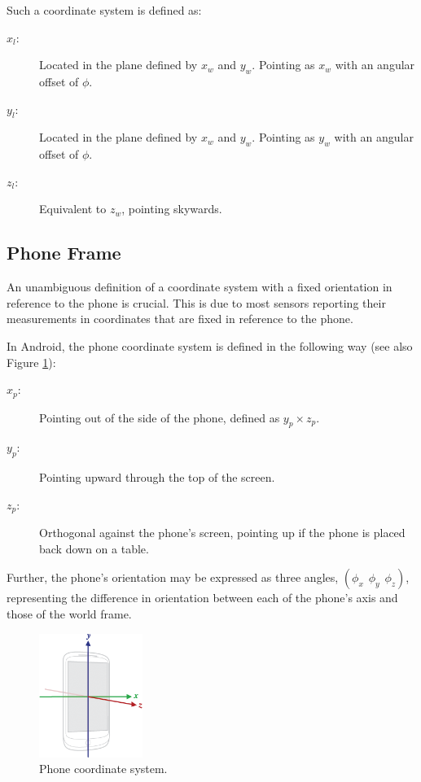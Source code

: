 \documentclass{LTHthesis}
\begin{document}
Such a coordinate system is defined as:
%
\begin{description}
\item[$x_l$:] Located in the plane defined by $x_w$ and $y_w$. Pointing as $x_w$ with an angular offset of $\phi$.
\item[$y_l$:] Located in the plane defined by $x_w$ and $y_w$. Pointing as $y_w$ with an angular offset of $\phi$.
\item[$z_l$:] Equivalent to $z_w$, pointing skywards.
\end{description}
%
\subsection{Phone Frame}
%
An unambiguous definition of a coordinate system with a fixed orientation in reference to the phone is crucial. This is due to most sensors reporting their measurements in coordinates that are fixed in reference to the phone. 

In Android, the phone coordinate system is defined in the following way (see also Figure \ref{axis_device}): 
%
\begin{description}
\item[$x_p$:] Pointing out of the side of the phone, defined as $y_p \times z_p$.
\item[$y_p$:] Pointing upward through the top of the screen.
\item[$z_p$:] Orthogonal against the phone's screen, pointing up if the phone is placed back down on a table.
\end{description}
%
Further, the phone's orientation may be expressed as three angles, $(\phi_x \hspace{5pt} \phi_y \hspace{5pt} \phi_z)$, representing the difference in orientation between each of the phone's axis and those of the world frame.
%
\begin{figure}[!hbt]
\begin{center}

\includegraphics[width=0.3\textwidth ]{images/background_on_navigation/axis_device.png}
\end{center}
\caption[]{Phone coordinate system.\footnotemark }\label{axis_device}
\end{figure}
%
\end{document}
